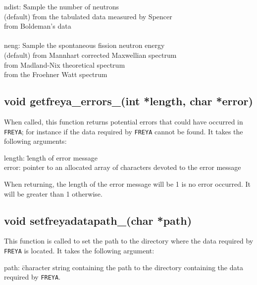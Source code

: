 \begin{tabbing}
\indent ndist: \= Sample the number of neutrons \\
\indent {} (default) \= 
from the tabulated data measured by Spencer \\
\indent {} \> from 
Boldeman's data \\
\\
\indent neng: Sample the spontaneous fission 
neutron energy \\
\indent {} (default)\> from Mannhart corrected  Maxwellian spectrum \\
\indent {} \> from Madland-Nix theoretical spectrum \\
\indent {} \> from the Froehner Watt spectrum \\
\end{tabbing}

\subsection*{void getfreya\_errors\_(int *length, char *error)}
When called, this function returns potential errors that could have occurred in {\tt FREYA}; for instance if the data required by {\tt FREYA} cannot be found. It takes the following arguments:
\begin{tabbing}
\indent length: \= length of error message \\
\indent error: \> pointer to an allocated array of characters devoted to the error message \\
\end{tabbing}
When returning, the length of the error message will be 1 is no error occurred. It will be greater than 1 otherwise.

\subsection*{void setfreyadatapath\_(char *path)}
This function is called to set the path to the directory where the data required by {\tt FREYA} is located. It takes the following argument:
\begin{tabbing}
\indent path: \= character string containing the path to the directory containing the data required by {\tt FREYA}. \\
\end{tabbing}

